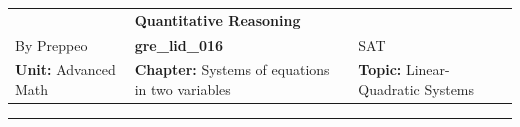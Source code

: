 \documentclass[11pt,paper=a4,answers]{exam}
\begin{document}
\begin{center}
    \centering
    \renewcommand{\arraystretch}{1.5}
    \begin{tabularx}{\textwidth}{YYY}
    & \normalsize\bf{{\Large{{Quantitative Reasoning}}}} & \\
    By Preppeo & \normalsize\bf{{gre\_lid\_016}} & SAT\\
    \normalsize{{\textbf{{Unit:}} Advanced Math}} & \normalsize{{\textbf{{Chapter:}} Systems of equations in two variables}} & \normalsize{{\textbf{{Topic:}} Linear-Quadratic Systems}} \\
    \end{tabularx}
\end{center}
\par\noindent\rule{\textwidth}{1pt}
\end{document}
